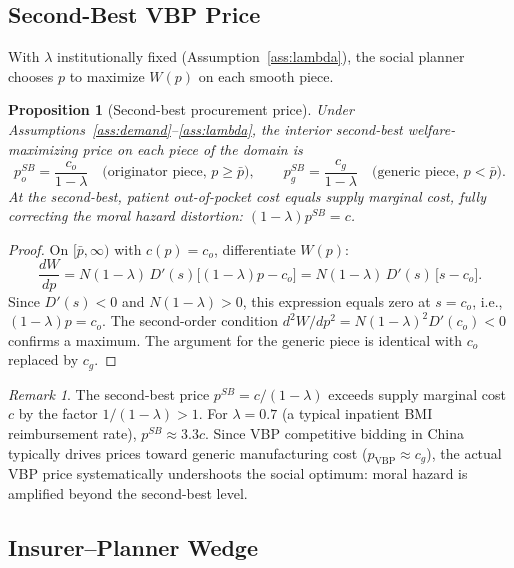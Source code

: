 \documentclass[12pt]{article}
\theoremstyle{plain}
\newtheorem{proposition}{Proposition}
\theoremstyle{definition}
\theoremstyle{remark}
\newtheorem{remark}{Remark}
\newcommand{\pbar}{\bar{p}}
\newcommand{\1}{\mathbf{1}}
\begin{document}
\subsection{Second-Best VBP Price}

With $\lambda$ institutionally fixed (Assumption~\ref{ass:lambda}), the social planner chooses $p$ to maximize $W(p)$ on each smooth piece.

\begin{proposition}[Second-best procurement price]
\label{prop:secondbest}
Under Assumptions~\ref{ass:demand}--\ref{ass:lambda}, the interior second-best welfare-maximizing price on each piece of the domain is
\begin{equation}
p^{SB}_o = \frac{c_o}{1-\lambda} \quad \text{(originator piece, } p \geq \pbar\text{)}, \qquad p^{SB}_g = \frac{c_g}{1-\lambda} \quad \text{(generic piece, } p < \pbar\text{)}.
\label{eq:secondbest}
\end{equation}
At the second-best, patient out-of-pocket cost equals supply marginal cost, fully correcting the moral hazard distortion: $(1-\lambda)p^{SB} = c$.
\end{proposition}

\begin{proof}
On $[\pbar, \infty)$ with $c(p) = c_o$, differentiate $W(p)$:
$$\frac{dW}{dp} = N(1-\lambda)\,D'(s)\bigl[(1-\lambda)p - c_o\bigr] = N(1-\lambda)\,D'(s)\,\bigl[s - c_o\bigr].$$
Since $D'(s) < 0$ and $N(1-\lambda) > 0$, this expression equals zero at $s = c_o$, i.e., $(1-\lambda)p = c_o$. The second-order condition $d^2W/dp^2 = N(1-\lambda)^2 D'(c_o) < 0$ confirms a maximum. The argument for the generic piece is identical with $c_o$ replaced by $c_g$.
\end{proof}

\begin{remark}
The second-best price $p^{SB} = c/(1-\lambda)$ exceeds supply marginal cost $c$ by the factor $1/(1-\lambda) > 1$. For $\lambda = 0.7$ (a typical inpatient BMI reimbursement rate), $p^{SB} \approx 3.3c$. Since VBP competitive bidding in China typically drives prices toward generic manufacturing cost ($p_{\mathrm{VBP}} \approx c_g$), the actual VBP price systematically undershoots the social optimum: moral hazard is amplified beyond the second-best level.
\end{remark}

\subsection{Insurer--Planner Wedge}
\end{document}
